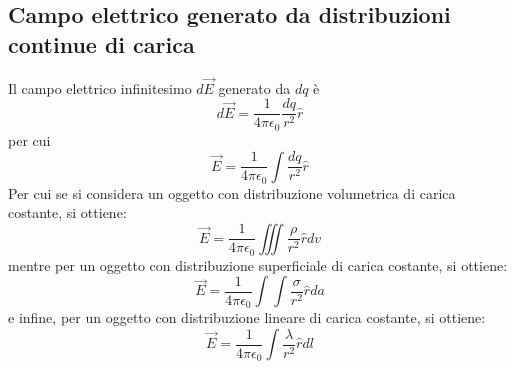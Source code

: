 \documentclass[a4paper]{extarticle}
\begin{document}
\vspace{1em}
\noindent
\subsection{Campo elettrico generato da distribuzioni continue di carica}
Il campo elettrico infinitesimo $d \vec{E}$ generato da $dq$ è 
\[d \vec{E} = \frac{1}{4 \pi \epsilon_0} \frac{dq}{r^2} \hat{r}\]
per cui
\[\vec E = \frac{1}{4 \pi \epsilon_0} \int \frac{dq}{r^2} \hat{r}\]
Per cui se si considera un oggetto con distribuzione volumetrica di carica costante, si ottiene:
\[\vec E = \frac{1}{4 \pi \epsilon_0} \iiint \frac{\rho}{r^2} \hat{r} dv\]
mentre per un oggetto con distribuzione superficiale di carica costante, si ottiene:
\[\vec E = \frac{1}{4 \pi \epsilon_0} \int \int \frac{\sigma}{r^2} \hat{r} da\]
e infine, per un oggetto con distribuzione lineare di carica costante, si ottiene:
\[\vec E = \frac{1}{4 \pi \epsilon_0} \int \frac{\lambda}{r^2} \hat{r} dl\]

\vspace{1em}
\noindent
\end{document}

